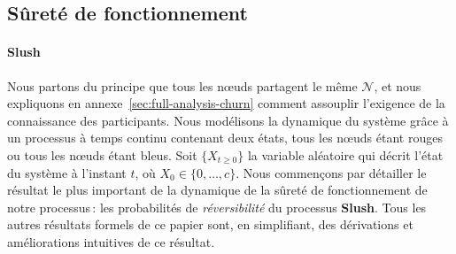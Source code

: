 \documentclass[a4,twocolumn,10pt]{article}
\theoremstyle{definition}
\begin{document}



\subsection{Sûreté de fonctionnement}


\paragraph{Slush}
Nous partons du principe que tous les nœuds partagent le même $\mathcal{N}$, et 
nous expliquons en annexe~\ref{sec:full-analysis-churn} comment assouplir l'exigence de la connaissance des participants.
Nous modélisons la dynamique du système grâce à un processus à temps continu contenant deux états, tous les nœuds étant
rouges ou tous les nœuds étant bleus. Soit $\{X_{t \geq 0}\}$ la variable aléatoire qui décrit l'état du système à
l'instant $t$, où $X_0 \in \{0, \dots, c\}$.
Nous commençons par détailler le résultat le plus important de la dynamique de la sûreté de fonctionnement de notre
processus\,: les probabilités de \emph{réversibilité} du processus \textbf{Slush}. Tous les autres résultats formels de
ce papier sont, en simplifiant, des dérivations et améliorations intuitives de ce résultat.
\end{document}
